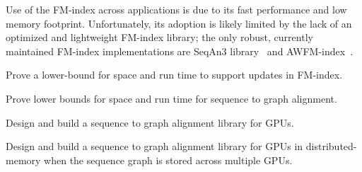 Use of the FM-index across applications is due to its fast performance and low memory footprint. Unfortunately, its adoption is likely limited by the lack of an optimized and lightweight FM-index library; the only robust, currently maintained FM-index implementations are SeqAn3 library~\cite{Reinert2017} and AWFM-index~\cite{Anderson2021}.


\begin{rproblem}
Prove a lower-bound for space and run time to support updates in FM-index.
\end{rproblem}


\begin{rproblem}
Prove lower bounds for space and run time for sequence to graph alignment.
\end{rproblem}

\begin{rproblem}
Design and build a sequence to graph alignment library for GPUs.
\end{rproblem}


\begin{rproblem}
Design and build a sequence to graph alignment library for GPUs in distributed-memory when the sequence graph is stored across multiple GPUs.
\end{rproblem}






